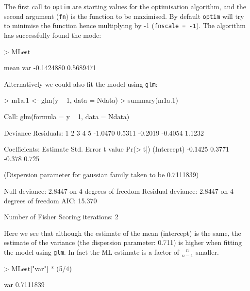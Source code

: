 \documentclass{article}
\begin{document}
\iftalk
\else
\fi

The first call to \texttt{optim} are starting values for the optimisation algorithm, and the second argument (\texttt{fn}) is the function to be maximised. By default \texttt{optim} will try to minimise the function hence multiplying by -1 (\texttt{fnscale = -1}).  The algorithm has successfully found the mode:

\begin{Schunk}
\begin{Sinput}
> MLest
\end{Sinput}
\begin{Soutput}
      mean        var 
-0.1424880  0.5689471 
\end{Soutput}
\end{Schunk}

Alternatively we could also fit the model using \texttt{glm}:

\begin{Schunk}
\begin{Sinput}
> m1a.1 <- glm(y ~ 1, data = Ndata)
> summary(m1a.1)
\end{Sinput}
\begin{Soutput}
Call:
glm(formula = y ~ 1, data = Ndata)

Deviance Residuals: 
      1        2        3        4        5  
-1.0470   0.5311  -0.2019  -0.4054   1.1232  

Coefficients:
            Estimate Std. Error t value Pr(>|t|)
(Intercept)  -0.1425     0.3771  -0.378    0.725

(Dispersion parameter for gaussian family taken to be 0.7111839)

    Null deviance: 2.8447  on 4  degrees of freedom
Residual deviance: 2.8447  on 4  degrees of freedom
AIC: 15.370

Number of Fisher Scoring iterations: 2
\end{Soutput}
\end{Schunk}
 
Here we see that although the estimate of the mean (intercept) is the same, the estimate of the variance (the dispersion parameter: 0.711) is higher when fitting the model using \texttt{glm}. In fact the ML estimate is a factor of $\frac{n}{n-1}$ smaller.

\begin{Schunk}
\begin{Sinput}
> MLest["var"] * (5/4)
\end{Sinput}
\begin{Soutput}
      var 
0.7111839 
\end{Soutput}
\end{Schunk}
\end{document}
